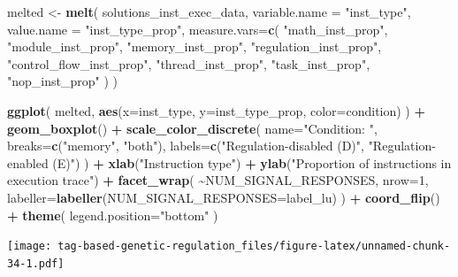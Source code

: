 \documentclass[
]{book}
\newenvironment{Shaded}{\begin{snugshade}}{\end{snugshade}}
\newcommand{\DataTypeTok}[1]{\textcolor[rgb]{0.13,0.29,0.53}{#1}}
\newcommand{\DecValTok}[1]{\textcolor[rgb]{0.00,0.00,0.81}{#1}}
\newcommand{\KeywordTok}[1]{\textcolor[rgb]{0.13,0.29,0.53}{\textbf{#1}}}
\newcommand{\NormalTok}[1]{#1}
\newcommand{\OperatorTok}[1]{\textcolor[rgb]{0.81,0.36,0.00}{\textbf{#1}}}
\newcommand{\StringTok}[1]{\textcolor[rgb]{0.31,0.60,0.02}{#1}}
\begin{document}
\begin{Shaded}
\begin{Highlighting}[]
\NormalTok{melted \textless{}{-}}\StringTok{ }\KeywordTok{melt}\NormalTok{(}
\NormalTok{  solutions\_inst\_exec\_data,}
  \DataTypeTok{variable.name =} \StringTok{"inst\_type"}\NormalTok{,}
  \DataTypeTok{value.name =} \StringTok{"inst\_type\_prop"}\NormalTok{,}
  \DataTypeTok{measure.vars=}\KeywordTok{c}\NormalTok{(}
    \StringTok{"math\_inst\_prop"}\NormalTok{,}
    \StringTok{"module\_inst\_prop"}\NormalTok{,}
    \StringTok{"memory\_inst\_prop"}\NormalTok{,}
    \StringTok{"regulation\_inst\_prop"}\NormalTok{,}
    \StringTok{"control\_flow\_inst\_prop"}\NormalTok{,}
    \StringTok{"thread\_inst\_prop"}\NormalTok{,}
    \StringTok{"task\_inst\_prop"}\NormalTok{,}
    \StringTok{"nop\_inst\_prop"}
\NormalTok{  )}
\NormalTok{)}

\KeywordTok{ggplot}\NormalTok{( melted, }\KeywordTok{aes}\NormalTok{(}\DataTypeTok{x=}\NormalTok{inst\_type, }\DataTypeTok{y=}\NormalTok{inst\_type\_prop, }\DataTypeTok{color=}\NormalTok{condition) ) }\OperatorTok{+}
\StringTok{  }\KeywordTok{geom\_boxplot}\NormalTok{() }\OperatorTok{+}
\StringTok{  }\KeywordTok{scale\_color\_discrete}\NormalTok{(}
    \DataTypeTok{name=}\StringTok{"Condition: "}\NormalTok{,}
    \DataTypeTok{breaks=}\KeywordTok{c}\NormalTok{(}\StringTok{"memory"}\NormalTok{, }\StringTok{"both"}\NormalTok{),}
    \DataTypeTok{labels=}\KeywordTok{c}\NormalTok{(}\StringTok{"Regulation{-}disabled (D)"}\NormalTok{, }\StringTok{"Regulation{-}enabled (E)"}\NormalTok{)}
\NormalTok{  ) }\OperatorTok{+}
\StringTok{  }\KeywordTok{xlab}\NormalTok{(}\StringTok{"Instruction type"}\NormalTok{) }\OperatorTok{+}
\StringTok{  }\KeywordTok{ylab}\NormalTok{(}\StringTok{"Proportion of instructions in execution trace"}\NormalTok{) }\OperatorTok{+}
\StringTok{  }\KeywordTok{facet\_wrap}\NormalTok{(}
    \OperatorTok{\textasciitilde{}}\NormalTok{NUM\_SIGNAL\_RESPONSES,}
    \DataTypeTok{nrow=}\DecValTok{1}\NormalTok{,}
    \DataTypeTok{labeller=}\KeywordTok{labeller}\NormalTok{(}\DataTypeTok{NUM\_SIGNAL\_RESPONSES=}\NormalTok{label\_lu)}
\NormalTok{  ) }\OperatorTok{+}
\StringTok{  }\KeywordTok{coord\_flip}\NormalTok{() }\OperatorTok{+}
\StringTok{  }\KeywordTok{theme}\NormalTok{(}
    \DataTypeTok{legend.position=}\StringTok{"bottom"}
\NormalTok{  )}
\end{Highlighting}
\end{Shaded}

\texttt{[image: tag-based-genetic-regulation\_files/figure-latex/unnamed-chunk-34-1.pdf]}
\end{document}
